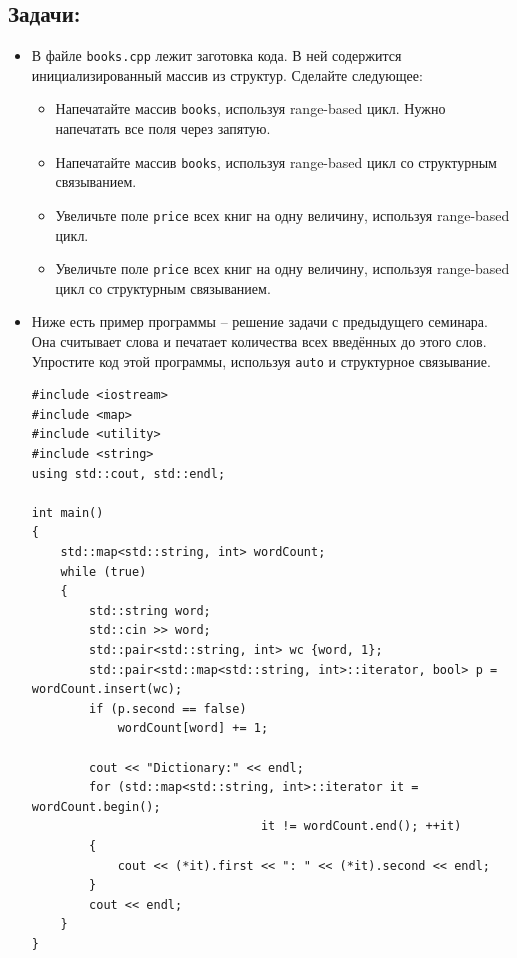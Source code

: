 \documentclass{article}
\begin{document}
\subsection*{Задачи:}
\begin{itemize}
\item В файле \texttt{books.cpp} лежит заготовка кода. В ней содержится инициализированный массив из структур. Сделайте следующее:
\begin{itemize}
\item Напечатайте массив \texttt{books}, используя range-based цикл. Нужно напечатать все поля через запятую.
\item Напечатайте массив \texttt{books}, используя range-based цикл со структурным связыванием.
\item Увеличьте поле \texttt{price} всех книг на одну величину, используя range-based цикл.
\item Увеличьте поле \texttt{price} всех книг на одну величину, используя range-based цикл со структурным связыванием.
\end{itemize}
\item Ниже есть пример программы -- решение задачи с предыдущего семинара. Она считывает слова и печатает количества всех введённых до этого слов.
Упростите код этой программы, используя \texttt{auto} и структурное связывание.
\begin{lstlisting}
#include <iostream>
#include <map>
#include <utility>
#include <string>
using std::cout, std::endl;

int main() 
{
    std::map<std::string, int> wordCount;
    while (true) 
    {
        std::string word;
        std::cin >> word;
        std::pair<std::string, int> wc {word, 1};
        std::pair<std::map<std::string, int>::iterator, bool> p = wordCount.insert(wc);
        if (p.second == false)
            wordCount[word] += 1;
        
        cout << "Dictionary:" << endl;
        for (std::map<std::string, int>::iterator it = wordCount.begin(); 
                                it != wordCount.end(); ++it)
        {
            cout << (*it).first << ": " << (*it).second << endl;
        }
        cout << endl;
    } 
}
\end{lstlisting}
\end{itemize}
\fi
\end{document}
